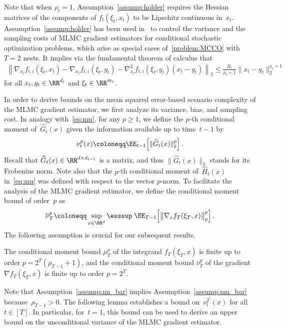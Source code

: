 \documentclass[11pt]{article}
\let\hat\widehat
\begin{document}
Note that when $\rho_t=1$, Assumption~\ref{assump:holder} requires the Hessian matrices of the components of $f_t(\xi_t,x_t)$ to be Lipschitz continuous in~$x_t$. Assumption~\ref{assump:holder} has been used in~\cite{goda2023constructing} to control the variance and the sampling costs of MLMC gradient estimators for conditional stochastic optimization problems, which arise as special cases of~\eqref{problem:MCCO} with~$T=2$ nests. It implies via the fundamental theorem of calculus that
\begin{align}\label{eq:inequality_for_holder_funs}
    \left\|\nabla_{x_t} f_{t,i} (\xi_t,x_t)-\nabla_{x_t} f_{t,i} (\xi_t,y_t) -\nabla^2_{x_t} f_{t,i} (\xi_t,y_t) (x_t-y_t) \right\|_2 \leq \frac{R_t}{\rho_t +1}\|x_t-y_t\|_2^{\rho_t+1}
\end{align}
for all $x_t,y_t\in\RR^{d_t}$ and $\xi_t\in\RR^{m_t}$. 

In order to derive bounds on the mean squared error-based scenario complexity of the MLMC gradient estimator, we first analyze its variance, bias, and sampling cost. In analogy with~\eqref{eq:mu}, for any $p \geq 1$, we define the $p$-th conditional moment of~$\hat{G}_t(x)$ given the information available up to time~$t-1$ by
\begin{align}\label{eq:nu}
    \nu_t^{p}(x) \coloneqq \EE_{t-1}\!\left[ \|\hat{G}_t(x)\|_2^p \right].
\end{align}
Recall that $\hat{G}_t(x)\in\RR^{d \times d_{t-1}}$ is a matrix, and thus $\|\hat{G}_t(x)\|_2$ stands for its Frobenius norm. Note also that the $p$-th conditional moment of~$\hat{H}_t(x)$ in~\eqref{eq:mu} was defined with respect to the vector $p$-norm. To facilitate the analysis of the MLMC gradient estimator, we define the conditional moment bound of order~$p$ as
\begin{align*}
    \overline\nu_T^{p}\coloneqq \sup_{x\in\RR^{d}}\esssup \; \EE_{T-1}\! \left[ \big\|\nabla_x f_T(\xi_T,x)\big\|^{p}_{p} \right].
\end{align*}
The following assumption is crucial for our subsequent results.
\begin{assumption}\label{assump:nu_bar}
    The conditional moment bound $\overline{\mu}_T^p $ of the integrand $ f_T(\xi_T,x)$ is finite up to order $p=2^T(\rho_{T-1}+1)$, and the conditional moment bound $\overline{\nu}_T^p $ of the gradient $\nabla f_T(\xi_T,x)$ is finite up to order $p=2^T$.
\end{assumption}
Note that Assumption~\ref{assump:nu_bar} implies Assumption~\ref{assump:mu_bar} because~$\rho_{T-1}>0$. The following lemma establishes a bound on~$\nu_t^{2^t}(x)$ for all~$t \in [T]$. In particular, for~$t = 1$, this bound can be used to derive an upper bound on the unconditional variance of the MLMC gradient estimator. 
\end{document}
